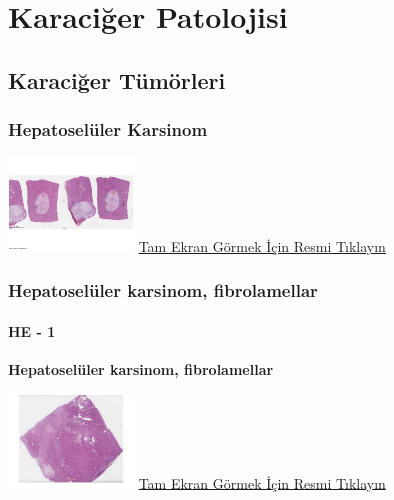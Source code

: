 \documentclass[
  letterpaper,
  DIV=11,
  numbers=noendperiod]{scrreprt}
\begin{document}
\part{Karaciğer Patolojisi}

\hypertarget{sec-karaciger-tumorleri}{%
\chapter{Karaciğer Tümörleri}\label{sec-karaciger-tumorleri}}

\hypertarget{sec-hepatoseluler-karsinom}{%
\section{Hepatoselüler Karsinom}\label{sec-hepatoseluler-karsinom}}

\href{https://images.patolojiatlasi.com/hepatocellularcarcinoma/HCC/viewer_z0.html}{\includegraphics[width=0.25\textwidth,height=\textheight]{./screenshots/thumbnail_hepatocellularcarcinoma.png}}
\href{https://images.patolojiatlasi.com/hepatocellularcarcinoma/HCC/viewer_z0.html}{Tam
Ekran Görmek İçin Resmi Tıklayın}

\hypertarget{sec-hepatoseluler-karsinom-fibrolamellar}{%
\section{Hepatoselüler karsinom,
fibrolamellar}\label{sec-hepatoseluler-karsinom-fibrolamellar}}

\hypertarget{he---1-1}{%
\subsection{HE - 1}\label{he---1-1}}

\textbf{Hepatoselüler karsinom, fibrolamellar}

\href{https://images.patolojiatlasi.com/fibrolamellar-hepatocellular-carcinoma/HE1.html}{\includegraphics[width=0.25\textwidth,height=\textheight]{./screenshots/thumbnail_fibrolamellar-hepatocellular-carcinoma-1.png}}
\href{https://images.patolojiatlasi.com/fibrolamellar-hepatocellular-carcinoma/HE1.html}{Tam
Ekran Görmek İçin Resmi Tıklayın}
\end{document}
